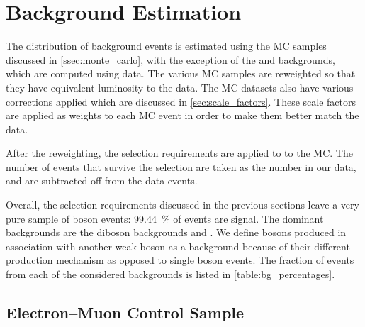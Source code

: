 






\section{Background Estimation}
\label{sec:background}

The distribution of background events is estimated using the MC samples
discussed in \cref{ssec:monte_carlo}, with the exception of the \QCDjets
and \wjets backgrounds, which are computed using data. The various MC samples
are reweighted so that they have equivalent luminosity to the data. The MC
datasets also have various corrections applied which are discussed in
\cref{sec:scale_factors}. These scale factors are applied as weights to
each MC event in order to make them better match the data.

After the reweighting, the selection requirements are applied to to the MC. The
number of events that survive the selection are taken as the number in our
data, and are subtracted off from the data events.

Overall, the selection requirements discussed in the previous sections leave a
very pure sample of \Z boson events: \SI{99.44}{\percent} of events are signal.
The dominant backgrounds are the diboson backgrounds and \ttbar. We define \Z
bosons produced in association with another weak boson as a background because
of their different production mechanism as opposed to single \Z boson events.
The fraction of events from each of the considered backgrounds is listed in
\cref{table:bg_percentages}.




\subsection{Electron--Muon Control Sample}
\label{ssec:emu_sample}

